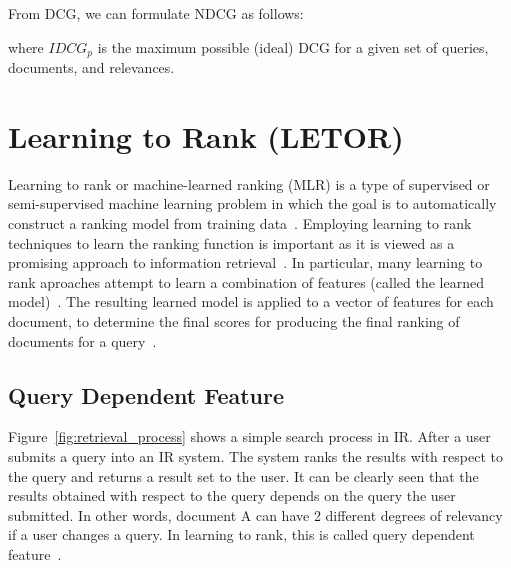 \begin{center}
\end{center}

From DCG, we can formulate NDCG as follows:
\begin{center}
\end{center}
where $IDCG_p$ is the maximum possible (ideal) DCG for a given set of queries, documents, and relevances.


\section{Learning to Rank (LETOR)}\label{sec:letor}
Learning to rank or machine-learned ranking (MLR) is a type of supervised or semi-supervised machine learning problem in which the goal is 
to automatically construct a ranking model from training data~\cite{letor}.
Employing learning to rank techniques to learn the ranking function is important as it is viewed as
a promising approach to information retrieval~\cite{letor}. In particular, many learning to rank aproaches attempt to learn a combination of features
(called the learned model)~\cite[P. 3]{learningmodel}. The resulting learned model is applied to a vector of features for each document, to determine the final scores for 
producing the final ranking of documents for a query~\cite[P. 3]{learningmodel}.

\subsection{Query Dependent Feature}\label{section:querydependent}
Figure~\ref{fig:retrieval_process} shows a simple search process in IR. After a user submits a query into an IR system. The system ranks the results 
with respect to the query and returns a result set to the user. It can be clearly seen that the results obtained with respect to the query depends on the 
query the user submitted. In other words, document A can have 2 different degrees of relevancy if a user changes a query.
In learning to rank, this is called query dependent feature~\cite{craig}.

